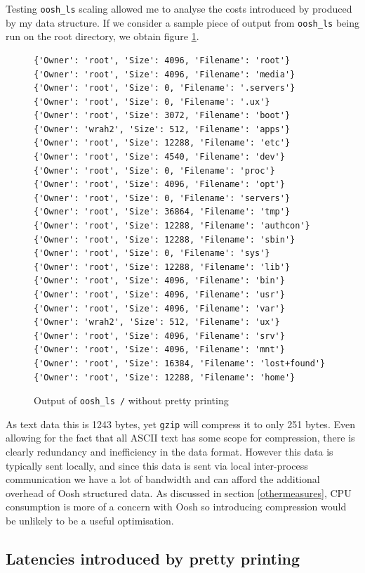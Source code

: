 \documentclass[12pt,twoside,notitlepage]{report}
\begin{document}
Testing {\tt oosh\_ls} scaling allowed me to analyse the costs
introduced by produced by my data structure. If we consider a sample
piece of output from {\tt oosh\_ls} being run on the root directory,
we obtain figure \ref{lsroot}.

\begin{figure}
\label{lsroot}
\caption{Output of {\tt oosh\_ls /} without pretty printing}
\begin{verbatim}
{'Owner': 'root', 'Size': 4096, 'Filename': 'root'}
{'Owner': 'root', 'Size': 4096, 'Filename': 'media'}
{'Owner': 'root', 'Size': 0, 'Filename': '.servers'}
{'Owner': 'root', 'Size': 0, 'Filename': '.ux'}
{'Owner': 'root', 'Size': 3072, 'Filename': 'boot'}
{'Owner': 'wrah2', 'Size': 512, 'Filename': 'apps'}
{'Owner': 'root', 'Size': 12288, 'Filename': 'etc'}
{'Owner': 'root', 'Size': 4540, 'Filename': 'dev'}
{'Owner': 'root', 'Size': 0, 'Filename': 'proc'}
{'Owner': 'root', 'Size': 4096, 'Filename': 'opt'}
{'Owner': 'root', 'Size': 0, 'Filename': 'servers'}
{'Owner': 'root', 'Size': 36864, 'Filename': 'tmp'}
{'Owner': 'root', 'Size': 12288, 'Filename': 'authcon'}
{'Owner': 'root', 'Size': 12288, 'Filename': 'sbin'}
{'Owner': 'root', 'Size': 0, 'Filename': 'sys'}
{'Owner': 'root', 'Size': 12288, 'Filename': 'lib'}
{'Owner': 'root', 'Size': 4096, 'Filename': 'bin'}
{'Owner': 'root', 'Size': 4096, 'Filename': 'usr'}
{'Owner': 'root', 'Size': 4096, 'Filename': 'var'}
{'Owner': 'wrah2', 'Size': 512, 'Filename': 'ux'}
{'Owner': 'root', 'Size': 4096, 'Filename': 'srv'}
{'Owner': 'root', 'Size': 4096, 'Filename': 'mnt'}
{'Owner': 'root', 'Size': 16384, 'Filename': 'lost+found'}
{'Owner': 'root', 'Size': 12288, 'Filename': 'home'}
\end{verbatim}
\end{figure}

As text data this is 1243 bytes, yet {\tt gzip} will compress it to
only 251 bytes. Even allowing for the fact that all ASCII text has
some scope for compression, there is clearly redundancy and inefficiency in the
data format. However this data is typically sent locally, and since
this data is sent via local inter-process communication we have a lot
of bandwidth and can afford the additional overhead of Oosh structured
data. As discussed in section \ref{othermeasures}, CPU consumption is
more of a concern with Oosh so introducing compression would be
unlikely to be a useful optimisation.

\subsection{Latencies introduced by pretty printing}
\end{document}
